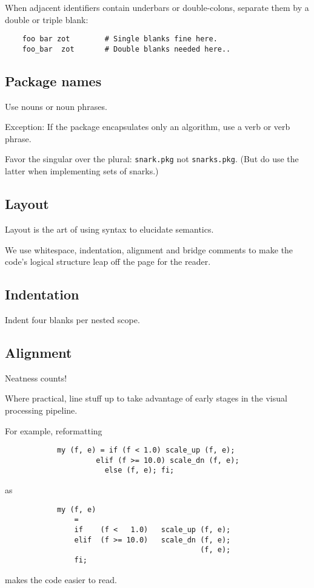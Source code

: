 When adjacent identifiers contain underbars or double-colons, 
separate them by a double or triple blank:
\begin{verbatim}
    foo bar zot        # Single blanks fine here.
    foo_bar  zot       # Double blanks needed here..
\end{verbatim}

\subsection{Package names}

Use nouns or noun phrases. 

Exception: If the package encapsulates only an algorithm, use a verb or verb phrase.

Favor the singular over the plural:  {\tt snark.pkg} not {\tt snarks.pkg}. 
(But do use the latter when implementing sets of snarks.)


\subsection{Layout}

Layout is the art of using syntax to elucidate semantics. 

We use whitespace, indentation, alignment and bridge comments 
to make the code's logical structure leap off the page for 
the reader.

\subsection{Indentation}

Indent four blanks per nested scope.

\subsection{Alignment}

Neatness counts! 

Where practical, line stuff up to take advantage 
of early stages in the visual processing pipeline.

For example, reformatting
\begin{verbatim}
            my (f, e) = if (f < 1.0) scale_up (f, e);
                     elif (f >= 10.0) scale_dn (f, e);
                       else (f, e); fi;
\end{verbatim}
as
\begin{verbatim}
            my (f, e)
                =
                if    (f <   1.0)   scale_up (f, e);
                elif  (f >= 10.0)   scale_dn (f, e);
                                             (f, e);
                fi;
\end{verbatim}
makes the code easier to read.


